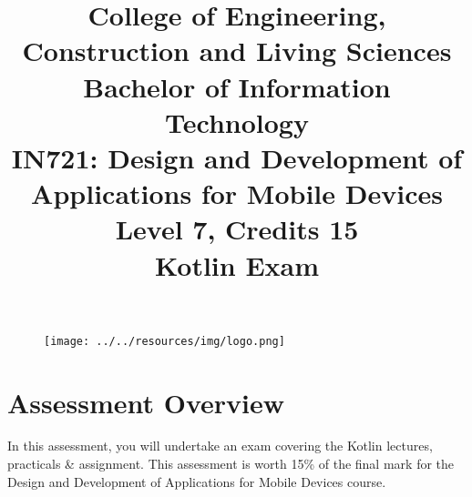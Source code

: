 \documentclass{article}
\author{}
\begin{document}
\begin{figure}
	\centering
	\texttt{[image: ../../resources/img/logo.png]} 
\end{figure}

\title{College of Engineering, Construction and Living Sciences\\Bachelor of Information Technology\\IN721: Design and Development of Applications for Mobile Devices\\Level 7, Credits 15\\\textbf{Kotlin Exam}}
\date{}
\maketitle

\section*{Assessment Overview}
In this assessment, you will undertake an exam covering the Kotlin lectures, practicals \& assignment. This assessment is worth 15\% of the final mark for the Design and Development of Applications for Mobile Devices course. 
\end{document}
